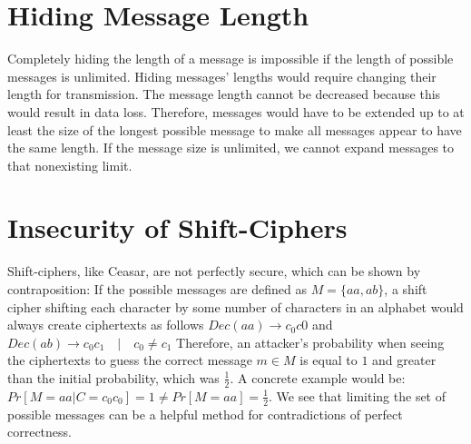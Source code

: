 \section{Hiding Message Length}

Completely hiding the length of a message is impossible if the length of possible messages is unlimited. Hiding messages' lengths would require changing their length for transmission. The message length cannot be decreased because this would result in data loss. Therefore, messages would have to be extended up to at least the size of the longest possible message to make all messages appear to have the same length. If the message size is unlimited, we cannot expand messages to that nonexisting limit.

\section{Insecurity of Shift-Ciphers}

Shift-ciphers, like Ceasar, are not perfectly secure, which can be shown by contraposition: If the possible messages are defined as $M=\{aa, ab\}$, a shift cipher shifting each character by some number of characters in an alphabet would always create ciphertexts as follows $Dec(aa) \rightarrow c_{0}c{0}$ and $Dec(ab) \rightarrow c_{0}c_{1} \quad|\quad c_{0} \neq c_{1}$ Therefore, an attacker's probability when seeing the ciphertexts to guess the correct message $m \in M$ is equal to $1$ and greater than the initial probability, which was $\frac{1}{2}$. A concrete example would be: $Pr[M=aa | C=c_{0}c_{0}] = 1 \neq Pr[M=aa] = \frac{1}{2}$. We see that limiting the set of possible messages can be a helpful method for contradictions of perfect correctness.